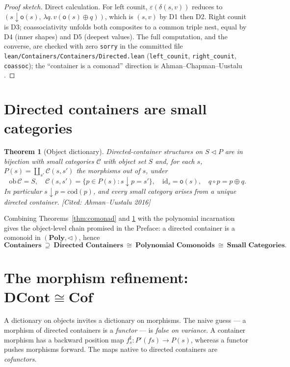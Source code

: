 \documentclass[11pt,a4paper]{book}
\newcommand{\Cof}{\mathbf{Cof}}
\newcommand{\DCont}{\mathbf{DCont}}
\newcommand{\Poly}{\mathbf{Poly}}
\newcommand{\cont}[2]{#1 \triangleleft #2}
\newcommand{\id}{\mathrm{id}}
\newcommand{\cod}{\mathrm{cod}}
\newcommand{\ob}{\mathrm{ob}\,}
\theoremstyle{plain}
\newtheorem{Theorem}{Theorem}[chapter]
\theoremstyle{definition}
\theoremstyle{remark}
\newcommand{\prov}[1]{\hfill\textsf{\footnotesize[#1]}}
\begin{document}
\begin{proof}[Proof sketch]
Direct calculation. For left counit, $\varepsilon(\delta(s,v))$ reduces to
$(s\downarrow\mathsf o(s),\,\lambda q.\,v(\mathsf o(s)\oplus q))$, which is $(s,v)$
by D1 then D2. Right counit is D3; coassociativity unfolds both composites to a
common triple nest, equal by D4 (inner shapes) and D5 (deepest values). The full
computation, and the converse, are checked with zero \texttt{sorry} in the
committed file \texttt{lean/Containers/Containers/Directed.lean}
(\texttt{left\_counit}, \texttt{right\_counit}, \texttt{coassoc}); the
``container is a comonad'' direction is Ahman--Chapman--Uustalu \cite{ACU14}.
\end{proof}

\section{Directed containers are small categories}

\begin{Theorem}[Object dictionary]\label{thm:objdict}
Directed-container structures on $\cont SP$ are in bijection with small categories
$\mathcal C$ with object set $S$ and, for each $s$,
$P(s)=\coprod_{s'}\mathcal C(s,s')$ the morphisms \emph{out of} $s$, under
\[
  \ob\mathcal C=S,\quad
  \mathcal C(s,s')=\{p\in P(s):s\downarrow p=s'\},\quad
  \id_s=\mathsf o(s),\quad
  q\circ p=p\oplus q .
\]
In particular $s\downarrow p=\cod(p)$, and every small category arises from a
unique directed container.
\prov{Cited: Ahman--Uustalu 2016}
\end{Theorem}

Combining Theorems~\ref{thm:comonad} and \ref{thm:objdict} with the polynomial
incarnation gives the object-level chain promised in the Preface: a directed
container is a comonoid in $(\Poly,\triangleleft)$, hence
\[
  \textbf{Containers}\ \supseteq\ \textbf{Directed Containers}
  \ \cong\ \textbf{Polynomial Comonoids}\ \cong\ \textbf{Small Categories}.
\]

\section{The morphism refinement: \texorpdfstring{$\DCont\cong\Cof$}{DCont = Cof}}

A dictionary on objects invites a dictionary on morphisms. The naive guess --- a
morphism of directed containers is a \emph{functor} --- is \emph{false on
variance}. A container morphism has a backward position map
$f^\sharp_s\colon P'(fs)\to P(s)$, whereas a functor pushes morphisms forward. The
maps native to directed containers are \emph{cofunctors}.
\end{document}
